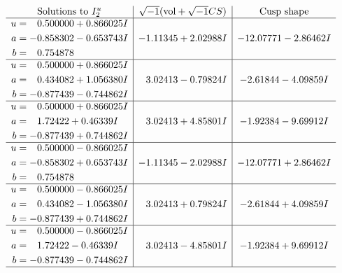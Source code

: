 \documentclass[1p]{elsarticle_modified}
\theoremstyle{definition}
\newcommand{\I}{\sqrt{-1}}
\begin{document}
$$\begin{array}{c|c|c}  
\text{Solutions to }I^u_{2}& \I (\text{vol} + \sqrt{-1}CS) & \text{Cusp shape}\\
 \hline 
\begin{aligned}
u &= \phantom{-}0.500000 + 0.866025 I \\
a &= -0.858302 - 0.653743 I \\
b &= \phantom{-}0.754878\phantom{ +0.000000I}\end{aligned}
 & -1.11345 + 2.02988 I & -12.07771 - 2.86462 I \\ \hline\begin{aligned}
u &= \phantom{-}0.500000 + 0.866025 I \\
a &= \phantom{-}0.434082 + 1.056380 I \\
b &= -0.877439 - 0.744862 I\end{aligned}
 & \phantom{-}3.02413 - 0.79824 I & -2.61844 - 4.09859 I \\ \hline\begin{aligned}
u &= \phantom{-}0.500000 + 0.866025 I \\
a &= \phantom{-}1.72422 + 0.46339 I \\
b &= -0.877439 + 0.744862 I\end{aligned}
 & \phantom{-}3.02413 + 4.85801 I & -1.92384 - 9.69912 I \\ \hline\begin{aligned}
u &= \phantom{-}0.500000 - 0.866025 I \\
a &= -0.858302 + 0.653743 I \\
b &= \phantom{-}0.754878\phantom{ +0.000000I}\end{aligned}
 & -1.11345 - 2.02988 I & -12.07771 + 2.86462 I \\ \hline\begin{aligned}
u &= \phantom{-}0.500000 - 0.866025 I \\
a &= \phantom{-}0.434082 - 1.056380 I \\
b &= -0.877439 + 0.744862 I\end{aligned}
 & \phantom{-}3.02413 + 0.79824 I & -2.61844 + 4.09859 I \\ \hline\begin{aligned}
u &= \phantom{-}0.500000 - 0.866025 I \\
a &= \phantom{-}1.72422 - 0.46339 I \\
b &= -0.877439 - 0.744862 I\end{aligned}
 & \phantom{-}3.02413 - 4.85801 I & -1.92384 + 9.69912 I\\
 \hline 
 \end{array}$$\newpage
\end{document}
